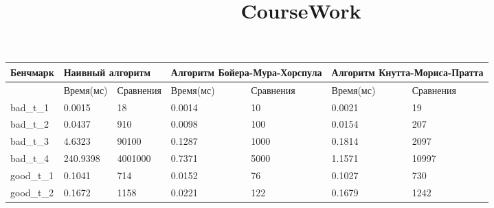 \documentclass{article}
\title{CourseWork}
\author{}
\date{}
\begin{document}
\setlength{\parindent}{35pt}
\setlength{\footnotemargin}{5pt}
\sloppy
\frenchspacing %



\begin{table}[!h]
    \begin{center}
        \begin{tabular}{ | m{4.1em} | m{4.5em} | m{4.5em} | m{4.5em} | m{4.5em} | m{4.5em} | m{4.5em}| }
            \hline
            Бенчмарк   & \multicolumn{2}{p{9em}|}{Наивный алгоритм} & \multicolumn{2}{p{9em}|}{Алгоритм Бойера-Мура-Хорспула} & \multicolumn{2}{p{9em}|}{Алгоритм Кнутта-Мориса-Пратта}                                     \\
            \hline
                       & Время(мс)                                  & Сравнения                                               & Время(мс)                                               & Сравнения & Время(мс) & Сравнения \\
            \hline
            bad\_t\_1  & 0.0015                                     & 18                                                      & 0.0014                                                  & 10        & 0.0021    & 19        \\
            \hline
            bad\_t\_2  & 0.0437                                     & 910                                                     & 0.0098                                                  & 100       & 0.0154    & 207       \\
            \hline
            bad\_t\_3  & 4.6323                                     & 90100                                                   & 0.1287                                                  & 1000      & 0.1814    & 2097      \\
            \hline
            bad\_t\_4  & 240.9398                                   & 4001000                                                 & 0.7371                                                  & 5000      & 1.1571    & 10997     \\
            \hline
            good\_t\_1 & 0.1041                                     & 714                                                     & 0.0152                                                  & 76        & 0.1027    & 730       \\
            \hline
            good\_t\_2 & 0.1672                                     & 1158                                                    & 0.0221                                                  & 122       & 0.1679    & 1242      \\

\end{tabular}
\end{center}
\end{table}
\end{document}
